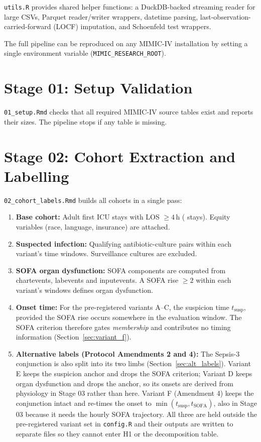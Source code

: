 \texttt{utils.R} provides shared helper functions: a DuckDB-backed streaming
reader for large CSVs, Parquet reader/writer wrappers, datetime parsing,
last-observation-carried-forward (LOCF) imputation, and Schoenfeld test
wrappers.

The full pipeline can be reproduced on any MIMIC-IV installation by setting a
single environment variable (\texttt{MIMIC\_RESEARCH\_ROOT}).


\section{Stage 01: Setup Validation}

\texttt{01\_setup.Rmd} checks that all required MIMIC-IV source tables exist
and reports their sizes. The pipeline stops if any table is missing.


\section{Stage 02: Cohort Extraction and Labelling}

\texttt{02\_cohort\_labels.Rmd} builds all cohorts in a single pass:

\begin{enumerate}
    \item \textbf{Base cohort:} Adult first ICU stays with LOS $\geq 4$\,h
    (\pcNStays{} stays). Equity variables (race, language, insurance) are attached.

    \item \textbf{Suspected infection:} Qualifying antibiotic-culture pairs
    within each variant's time windows. Surveillance cultures are excluded.

    \item \textbf{SOFA organ dysfunction:} SOFA components are computed from
    chartevents, labevents and inputevents. A SOFA rise
    $\geq 2$ within each variant's windows defines organ dysfunction.

    \item \textbf{Onset time:} For the pre-registered variants A--C, the
    suspicion time $t_{\text{susp}}$, provided the SOFA rise occurs somewhere in
    the evaluation window. The SOFA criterion therefore gates \emph{membership}
    and contributes no timing information (Section~\ref{sec:variant_f}).

    \item \textbf{Alternative labels (Protocol Amendments 2 and 4):} The Sepsis-3
    conjunction is also split into its two limbs
    (Section~\ref{sec:alt_labels}). Variant E keeps the suspicion anchor and
    drops the SOFA criterion; Variant D keeps organ dysfunction and drops the
    anchor, so its onsets are derived from physiology in Stage 03 rather than
    here. Variant F (Amendment 4) keeps the conjunction intact and re-times the
    onset to $\min(t_{\text{susp}}, t_{\text{SOFA}})$, also in Stage 03 because
    it needs the hourly SOFA trajectory. All three are held outside the
    pre-registered variant set in \texttt{config.R} and their outputs are
    written to separate files so they cannot enter H1 or the decomposition
    table.
\end{enumerate}

